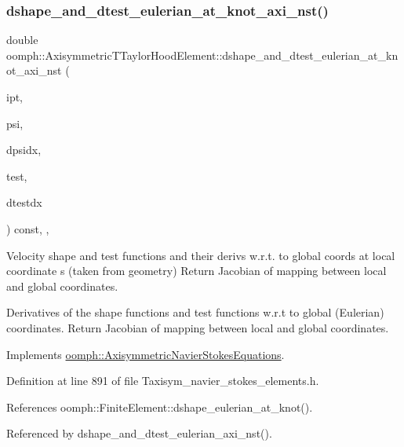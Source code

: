 \subsubsection{\texorpdfstring{dshape\+\_\+and\+\_\+dtest\+\_\+eulerian\+\_\+at\+\_\+knot\+\_\+axi\+\_\+nst()}{dshape\_and\_dtest\_eulerian\_at\_knot\_axi\_nst()}\hspace{0.1cm}{\footnotesize\ttfamily [1/2]}}
{\footnotesize\ttfamily double oomph\+::\+Axisymmetric\+T\+Taylor\+Hood\+Element\+::dshape\+\_\+and\+\_\+dtest\+\_\+eulerian\+\_\+at\+\_\+knot\+\_\+axi\+\_\+nst (\begin{DoxyParamCaption}\item[{const unsigned \&}]{ipt,  }\item[{\hyperlink{classoomph_1_1Shape}{Shape} \&}]{psi,  }\item[{\hyperlink{classoomph_1_1DShape}{D\+Shape} \&}]{dpsidx,  }\item[{\hyperlink{classoomph_1_1Shape}{Shape} \&}]{test,  }\item[{\hyperlink{classoomph_1_1DShape}{D\+Shape} \&}]{dtestdx }\end{DoxyParamCaption}) const\hspace{0.3cm}{\ttfamily [inline]}, {\ttfamily [protected]}, {\ttfamily [virtual]}}



Velocity shape and test functions and their derivs w.\+r.\+t. to global coords at local coordinate s (taken from geometry) Return Jacobian of mapping between local and global coordinates. 

Derivatives of the shape functions and test functions w.\+r.\+t to global (Eulerian) coordinates. Return Jacobian of mapping between local and global coordinates. 

Implements \hyperlink{classoomph_1_1AxisymmetricNavierStokesEquations_a76e090fdac4507d10eb9f81feb53a51b}{oomph\+::\+Axisymmetric\+Navier\+Stokes\+Equations}.



Definition at line 891 of file Taxisym\+\_\+navier\+\_\+stokes\+\_\+elements.\+h.



References oomph\+::\+Finite\+Element\+::dshape\+\_\+eulerian\+\_\+at\+\_\+knot().



Referenced by dshape\+\_\+and\+\_\+dtest\+\_\+eulerian\+\_\+axi\+\_\+nst().

\mbox{\label{classoomph_1_1AxisymmetricTTaylorHoodElement_a6bfdf91d1ce67542d27bee00ab026a20}} 

